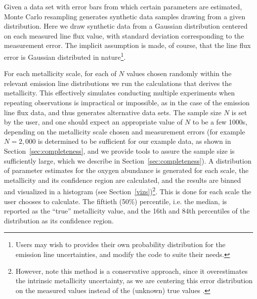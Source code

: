 \documentclass{emulateapj}
\begin{document}
Given a data set with error bars from which certain parameters are estimated, Monte Carlo resampling generates synthetic data samples drawing from a given distribution. 
Here we draw synthetic data from a Gaussian distribution centered on each measured line flux value, with standard deviation corresponding to the measurement error. The implicit assumption is made, of course, that the line flux error is Gaussian distributed in nature\footnote{Users may wish to provides their own probability distribution for the emission line uncertainties, and modify the code to suite their needs.}. 

For each metallicity scale, for each of $N$  values chosen randomly within the relevant emission line distributions we run the calculations that derives the metallicity.
This effectively simulates conducting multiple experiments when repeating observations is impractical or impossible, as in the case of the emission line flux data, and thus generates alternative data sets. 
The sample size $N$ is set by the user, and one should expect an appropriate value of $N$ to be a few 1000s, depending on the metallicity scale chosen and measurement errors (for example  $N=2,000$ is determined to be sufficient for our example data, as shown in Section~\ref{sec:completeness}, and we provide tools to assure the sample size is sufficiently large, which we describe in Section~\ref{sec:completeness}). 
A distribution of parameter estimates for the oxygen abundance is generated for each scale, the metallicity and its confidence region are calculated,
and the results are binned and visualized in a histogram (see Section~\ref{vizs})\footnote{However, note this method is a conservative approach, since it overestimates the intrinsic metallicity uncertainty, as we are centering this error distribution on the measured values instead of the (unknown) true values \citep{andrae10}.
}. This is done for each scale the user chooses to calculate. The fiftieth (50\%) percentile, i.e.  the median, is reported as the ``true'' metallicity value, and the 16th and 84th percentiles of the distribution as its confidence region. %
\end{document}
